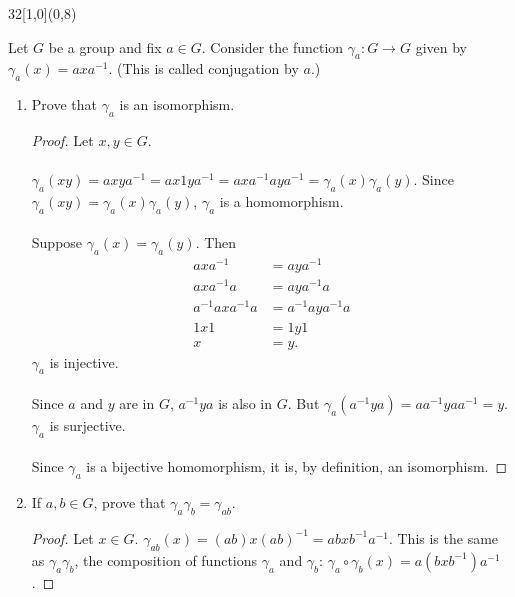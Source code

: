 \documentclass[12pt]{article}
\newenvironment{exercise}[2]{\begin{textblock}{32}[1,0](0,#2)\noindent#1\end{textblock}}{\vspace{1in}}
\begin{document}
\begin{exercise}{1.47}{8}
	{\noindent}Let $G$ be a group and fix $a\in G$. Consider the function $\gamma_a:G\to G$ given by $\gamma_a(x)=axa^{-1}$. (This is called conjugation by $a$.)
	\begin{enumerate}[(i.)]
		\item Prove that $\gamma_a$ is an isomorphism.
		\bigskip
		\begin{proof}
			Let $x,y\in G$.\\
			\\
			$\gamma_a(xy)=axya^{-1}=ax1ya^{-1}=axa^{-1}aya^{-1}=\gamma_a(x)\gamma_a(y)$.
			Since $\gamma_a(xy)=\gamma_a(x)\gamma_a(y)$, $\gamma_a$ is a homomorphism.\\
			\\
			Suppose $\gamma_a(x)=\gamma_a(y)$. Then
			\begin{align*}
				axa^{-1}&=aya^{-1}\\
				axa^{-1}a&=aya^{-1}a\\
				a^{-1}axa^{-1}a&=a^{-1}aya^{-1}a\\
				1x1&=1y1\\
				x&=y.
			\end{align*}
			$\gamma_a$ is injective.\\
			\\
			Since $a$ and $y$ are in $G$, $a^{-1}ya$ is also in $G$. But $\gamma_a(a^{-1}ya)=aa^{-1}yaa^{-1}=y$. $\gamma_a$ is surjective.\\
			\\
			Since $\gamma_a$ is a bijective homomorphism, it is, by definition, an isomorphism.
		\end{proof}

		\item If $a,b\in G$, prove that $\gamma_a\gamma_b=\gamma_{ab}$.
		\bigskip
		\begin{proof}
			Let $x\in G$. $\gamma_{ab}(x)=(ab)x(ab)^{-1}=abxb^{-1}a^{-1}$. This is the same as $\gamma_a\gamma_b$, the composition of functions $\gamma_a$ and $\gamma_b$: $\gamma_a\circ \gamma_b(x)=a(bxb^{-1})a^{-1}$.
		\end{proof}
	\end{enumerate}
\end{exercise}

\newpage
\end{document}
